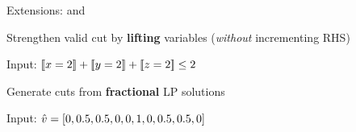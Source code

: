 \documentclass[aspectratio=169]{beamer}
\begin{document}
\begin{frame}{Extensions: \lazyCutlift and \lazyFractional}

\begin{description}[labelwidth=0.3cm]
	\item<1->[\lazyCutlift] Strengthen valid cut by \textbf{lifting} variables (\textit{without} incrementing RHS)

\medskip
Input: $\be{1}{2} + \be{2}{2} + \be{3}{2} \leq 2$


\bigskip
\item<3->[\lazyFractional] Generate cuts from \textbf{fractional} LP solutions

\medskip
Input: $\hat{v} = [0, 0.5, 0.5, 0, 0, 1, 0, 0.5, 0.5, 0]$

\end{description}

\end{frame}
\end{document}
